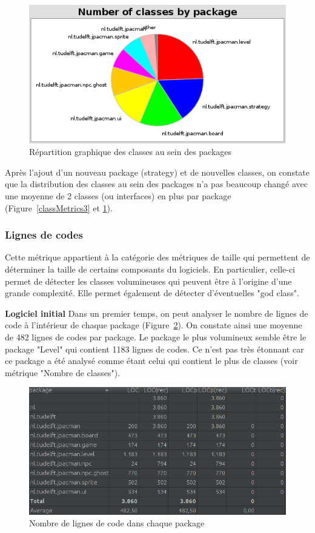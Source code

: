 \documentclass[12pt, openany]{report}
\begin{document}
\begin{figure}[!h]
	\centering
	\includegraphics[scale=0.7]{Images/classMetrics4.png} 
	\caption{Répartition graphique des classes au sein des packages}
	\label{classMetrics4}
\end{figure}

Après l'ajout d'un nouveau package (strategy) et de nouvelles classes, on constate que la distribution des classes au sein des packages n'a pas beaucoup changé avec une moyenne de 2 classes (ou interfaces) en plus par package (Figure~\ref{classMetrics3} et \ref{classMetrics4}).

\newpage

\subsubsection*{Lignes de codes}

Cette métrique appartient à la catégorie des métriques de taille qui permettent de déterminer la taille de certains composants du logiciels. En particulier, celle-ci permet de détecter les classes volumineuses qui peuvent être à l'origine d'une grande complexité. Elle permet également de détecter d'éventuelles "god class".

\textbf{Logiciel initial}
Dans un premier temps, on peut analyser le nombre de lignes de code à l'intérieur de chaque package (Figure~\ref{locinit}). On constate ainsi une moyenne de 482 lignes de codes par package. Le package le plus volumineux semble être le package "Level" qui contient 1183 lignes de codes. Ce n'est pas très étonnant car ce package a été analysé comme étant celui qui contient le plus de classes (voir métrique "Nombre de classes").

\begin{figure}[!h]
	\centering
	\includegraphics[scale=0.6]{Images/SizeMetricsLOC.png} 
	\caption{Nombre de lignes de code dans chaque package}
	\label{locinit}
\end{figure}
\end{document}
